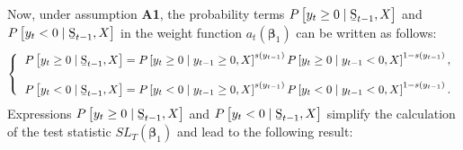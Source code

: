\documentclass[harvard,11pt]{article}
\begin{document}
Now, under assumption \textbf{A1}, the probability terms $P\left[
y_{t}\geq 0\mid \text{\b{S}}_{t-1},X\right] $ and $P\left[
y_{t}<0\mid \text{\b{S}}_{t-1},X\right] $ in the weight function $a_{t}(\bm{\beta}
_{1})$ can be written as follows:%
\begin{equation*}
\left\{ 
\begin{tabular}{l}
$P\left[ y_{t}\geq 0\mid \text{\b{S}}_{t-1},X\right] =P%
\left[ y_{t}\geq 0\mid y_{t-1}\geq 0,X\right] ^{s(y_{t-1})}P\left[
y_{t}\geq 0\mid y_{t-1}<0,X\right] ^{1-s(y_{t-1})},$ \\ 
\\ 
$P\left[ y_{t}<0\mid \text{\b{S}}_{t-1},X\right] =P\left[
y_{t}<0\mid y_{t-1}\geq 0,X\right] ^{s(y_{t-1})}P\left[ y_{t}<0\mid
y_{t-1}<0,X\right] ^{1-s(y_{t-1})}.$%
\end{tabular}%
\right. 
\end{equation*}%
Expressions $P\left[ y_{t}\geq 0\mid \text{%
\b{S}}_{t-1},X\right] $ and $P\left[ y_{t}<0\mid \text{\b{S}}%
_{t-1},X\right] $ simplify the calculation of the test statistic $%
SL_{T}(\bm{\beta}_{1})$ and lead to the following result:
\end{document}
